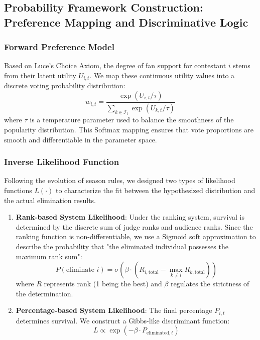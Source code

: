 \documentclass[12pt]{article}
\begin{document}
	\subsection{Probability Framework Construction: Preference Mapping and Discriminative Logic}
	\subsubsection{Forward Preference Model}
	Based on Luce's Choice Axiom, the degree of fan support for contestant $i$ stems from their latent utility $U_{i,t}$. We map these continuous utility values into a discrete voting probability distribution: 
	$$w_{i,t} = \frac{\exp(U_{i,t}/\tau)}{\sum_{k \in \mathcal{I}_t} \exp(U_{k,t}/\tau)}$$
	where $\tau$ is a temperature parameter used to balance the smoothness of the popularity distribution. This Softmax mapping ensures that vote proportions are smooth and differentiable in the parameter space.
	
	\subsubsection{Inverse Likelihood Function}
	Following the evolution of season rules, we designed two types of likelihood functions $L(\cdot)$ to characterize the fit between the hypothesized distribution and the actual elimination results.
	\begin{enumerate}
		\item \textbf{Rank-based System Likelihood}: Under the ranking system, survival is determined by the discrete sum of judge ranks and audience ranks. Since the ranking function is non-differentiable, we use a Sigmoid soft approximation to describe the probability that "the eliminated individual possesses the maximum rank sum": 
		$$P(\text{eliminate } i) = \sigma(\beta \cdot (R_{i, \text{total}} - \max_{k \neq i} R_{k, \text{total}}))$$
		where $R$ represents rank (1 being the best) and $\beta$ regulates the strictness of the determination.
		\item \textbf{Percentage-based System Likelihood}: The final percentage $P_{i,t}$ determines survival. We construct a Gibbs-like discriminant function: 
		$$L \propto \exp(-\beta \cdot P_{\text{eliminated}, t})$$
	\end{enumerate}
	
\end{document}

